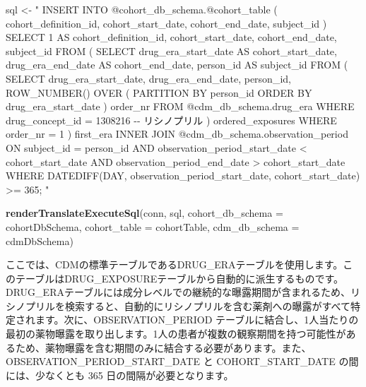 \documentclass[
  11pt]{book}
\newenvironment{Shaded}{\begin{snugshade}}{\end{snugshade}}
\newcommand{\AttributeTok}[1]{\textcolor[rgb]{0.13,0.29,0.53}{#1}}
\newcommand{\FunctionTok}[1]{\textcolor[rgb]{0.13,0.29,0.53}{\textbf{#1}}}
\newcommand{\NormalTok}[1]{#1}
\newcommand{\OtherTok}[1]{\textcolor[rgb]{0.56,0.35,0.01}{#1}}
\newcommand{\StringTok}[1]{\textcolor[rgb]{0.31,0.60,0.02}{#1}}
\theoremstyle{definition}
\theoremstyle{definition}
\theoremstyle{definition}
\theoremstyle{definition}
\theoremstyle{remark}
\begin{document}
\begin{Shaded}
\begin{Highlighting}[]
\NormalTok{sql }\OtherTok{\textless{}{-}} \StringTok{"}
\StringTok{INSERT INTO @cohort\_db\_schema.@cohort\_table (}
\StringTok{  cohort\_definition\_id,}
\StringTok{  cohort\_start\_date,}
\StringTok{  cohort\_end\_date,}
\StringTok{  subject\_id}
\StringTok{)}
\StringTok{SELECT 1 AS cohort\_definition\_id,}
\StringTok{  cohort\_start\_date,}
\StringTok{  cohort\_end\_date,}
\StringTok{  subject\_id}
\StringTok{FROM (}
\StringTok{  SELECT drug\_era\_start\_date AS cohort\_start\_date,}
\StringTok{    drug\_era\_end\_date AS cohort\_end\_date,}
\StringTok{    person\_id AS subject\_id}
\StringTok{  FROM (}
\StringTok{    SELECT drug\_era\_start\_date,}
\StringTok{      drug\_era\_end\_date,}
\StringTok{      person\_id,}
\StringTok{      ROW\_NUMBER() OVER (}
\StringTok{        PARTITION BY person\_id}
\StringTok{            ORDER BY drug\_era\_start\_date}
\StringTok{      ) order\_nr}
\StringTok{    FROM @cdm\_db\_schema.drug\_era}
\StringTok{    WHERE drug\_concept\_id = 1308216 {-}{-} リシノプリル}
\StringTok{  ) ordered\_exposures}
\StringTok{  WHERE order\_nr = 1}
\StringTok{) first\_era}
\StringTok{INNER JOIN @cdm\_db\_schema.observation\_period}
\StringTok{  ON subject\_id = person\_id}
\StringTok{    AND observation\_period\_start\_date \textless{} cohort\_start\_date}
\StringTok{    AND observation\_period\_end\_date \textgreater{} cohort\_start\_date}
\StringTok{WHERE DATEDIFF(DAY,}
\StringTok{               observation\_period\_start\_date,}
\StringTok{               cohort\_start\_date) \textgreater{}= 365;}
\StringTok{"}

\FunctionTok{renderTranslateExecuteSql}\NormalTok{(conn, sql,}
                          \AttributeTok{cohort\_db\_schema =}\NormalTok{ cohortDbSchema,}
                          \AttributeTok{cohort\_table =}\NormalTok{ cohortTable,}
                          \AttributeTok{cdm\_db\_schema =}\NormalTok{ cdmDbSchema)}
\end{Highlighting}
\end{Shaded}

ここでは、CDMの標準テーブルであるDRUG\_ERAテーブルを使用します。このテーブルはDRUG\_EXPOSUREテーブルから自動的に派生するものです。DRUG\_ERAテーブルには成分レベルでの継続的な曝露期間が含まれるため、リシノプリルを検索すると、自動的にリシノプリルを含む薬剤への曝露がすべて特定されます。次に、OBSERVATION\_PERIOD テーブルに結合し、1人当たりの最初の薬物曝露を取り出します。1人の患者が複数の観察期間を持つ可能性があるため、薬物曝露を含む期間のみに結合する必要があります。また、OBSERVATION\_PERIOD\_START\_DATE と COHORT\_START\_DATE の間には、少なくとも 365 日の間隔が必要となります。
\end{document}

